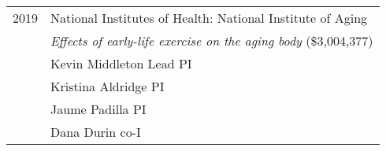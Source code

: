 \begin{longtable}{@{}lX@{}}
    2019 & National Institutes of Health: National Institute of Aging\\
         & \emph{Effects of early-life exercise on the aging body} (\$3,004,377)\\
         & Kevin Middleton Lead PI\\
         & Kristina Aldridge PI\\
         & Jaume Padilla PI\\
         & Dana Durin co-I\\[0.5pc]
\end{longtable}
